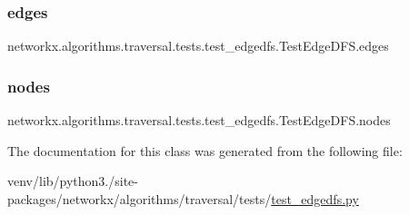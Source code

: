 \subsubsection{\texorpdfstring{edges}{edges}}
{\footnotesize\ttfamily networkx.\+algorithms.\+traversal.\+tests.\+test\+\_\+edgedfs.\+Test\+Edge\+D\+F\+S.\+edges}

\mbox{\label{classnetworkx_1_1algorithms_1_1traversal_1_1tests_1_1test__edgedfs_1_1TestEdgeDFS_a99a628ed210b69d434f6bede7914bfbb}} 
\subsubsection{\texorpdfstring{nodes}{nodes}}
{\footnotesize\ttfamily networkx.\+algorithms.\+traversal.\+tests.\+test\+\_\+edgedfs.\+Test\+Edge\+D\+F\+S.\+nodes}



The documentation for this class was generated from the following file\+:\begin{DoxyCompactItemize}
\item 
venv/lib/python3./site-\/packages/networkx/algorithms/traversal/tests/\hyperlink{test__edgedfs_8py}{test\+\_\+edgedfs.\+py}\end{DoxyCompactItemize}
